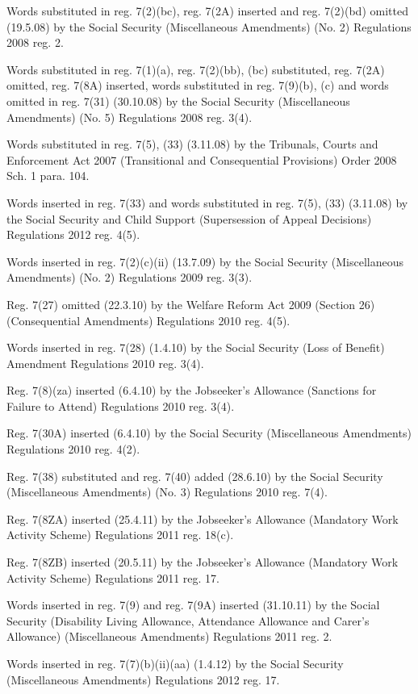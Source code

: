 \documentclass[12pt,a4paper]{article}
\begin{document}
{Words substituted in reg. 7(2)(bc), reg. 7(2A) inserted and reg. 7(2)(bd) omitted (19.5.08) by the Social Security (Miscellaneous Amendments) (No. 2) Regulations 2008 reg. 2.

Words substituted in reg. 7(1)(a), reg. 7(2)(bb), (bc) substituted, reg. 7(2A) omitted, reg. 7(8A) inserted, words substituted in reg. 7(9)(b), (c) and words omitted in reg. 7(31) (30.10.08) by the Social Security (Miscellaneous Amendments) (No. 5) Regulations 2008 reg. 3(4).

Words substituted in reg. 7(5), (33) (3.11.08) by the Tribunals, Courts and Enforcement Act 2007 (Transitional and Consequential Provisions) Order 2008 Sch. 1 para. 104.

Words inserted in reg. 7(33) and words substituted in reg. 7(5), (33) (3.11.08) by the Social Security and Child Support (Supersession of Appeal Decisions) Regulations 2012 reg. 4(5).

Words inserted in reg. 7(2)(c)(ii) (13.7.09) by the Social Security (Miscellaneous Amendments) (No. 2) Regulations 2009 reg. 3(3).

Reg. 7(27) omitted (22.3.10) by the Welfare Reform Act 2009 (Section 26) (Consequential Amendments) Regulations 2010 reg. 4(5).

Words inserted in reg. 7(28) (1.4.10) by the Social Security (Loss of Benefit) Amendment Regulations 2010 reg. 3(4).

Reg. 7(8)(za) inserted (6.4.10) by the Jobseeker’s Allowance (Sanctions for Failure to Attend) Regulations 2010 reg. 3(4).

Reg. 7(30A) inserted (6.4.10) by the Social Security (Miscellaneous Amendments) Regulations 2010 reg. 4(2).

Reg. 7(38) substituted and reg. 7(40) added (28.6.10) by the Social Security (Miscellaneous Amendments) (No. 3) Regulations 2010 reg. 7(4).

Reg. 7(8ZA) inserted (25.4.11) by the Jobseeker’s Allowance (Mandatory Work Activity Scheme) Regulations 2011 reg. 18(c).

Reg. 7(8ZB) inserted (20.5.11) by the Jobseeker’s Allowance (Mandatory Work Activity Scheme) Regulations 2011 reg. 17.

Words inserted in reg. 7(9) and reg. 7(9A) inserted (31.10.11) by the Social Security (Disability Living Allowance, Attendance Allowance and Carer's Allowance) (Miscellaneous Amendments) Regulations 2011 reg. 2.

Words inserted in reg. 7(7)(b)(ii)(aa) (1.4.12) by the Social Security (Miscellaneous Amendments) Regulations 2012 reg. 17.

}
\end{document}
